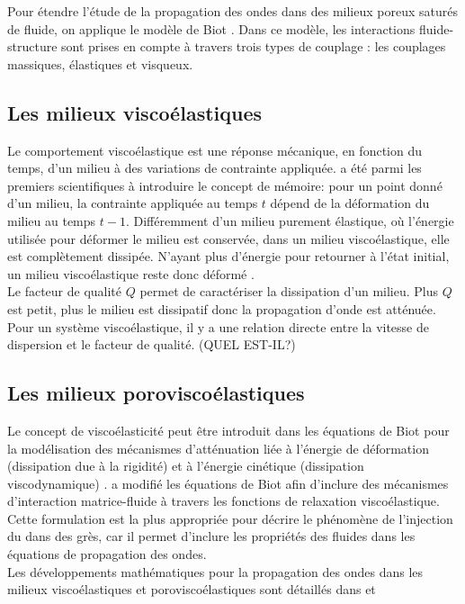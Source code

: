 Pour étendre l'étude de la propagation des ondes dans des milieux poreux saturés de fluide, on applique le modèle de Biot \citep{Biot1956a,Biot1956b}. Dans ce modèle, les interactions fluide-structure sont prises en compte à travers trois types de couplage : les couplages massiques, élastiques et visqueux.
\subsection{Les milieux viscoélastiques}
Le comportement viscoélastique est une réponse mécanique, en fonction du temps, d'un milieu à des variations de contrainte appliquée. \citet{Boltzmann1874} a été parmi les premiers scientifiques à introduire le concept de mémoire: pour un point donné d'un milieu, la contrainte appliquée au temps $t$ dépend de la déformation du milieu au temps $t-1$. Différemment d'un milieu purement élastique, où l'énergie utilisée pour déformer le milieu est conservée, dans un milieu viscoélastique, elle est complètement dissipée. N'ayant plus d'énergie pour retourner à l'état initial, un milieu viscoélastique reste donc déformé \citep{Carcione2007}. \\
Le facteur de qualité $Q$ permet de caractériser la dissipation d'un milieu. Plus $Q$ est petit, plus le milieu est dissipatif donc la propagation d'onde est atténuée. Pour un système viscoélastique, il y a une relation directe entre la vitesse de dispersion et le facteur de qualité. (QUEL EST-IL?)
\subsection{Les milieux poroviscoélastiques}
Le concept de viscoélasticité peut être introduit dans les équations de Biot \citep{Biot1956a,Biot1956b} pour la modélisation des mécanismes d'atténuation liée à l'énergie de déformation (dissipation due à la rigidité) et à l'énergie cinétique (dissipation viscodynamique) \citep{Carcione2007}. \citet{Carcione1998} a modifié les équations de Biot afin d'inclure des mécanismes d'interaction matrice-fluide à travers les fonctions de relaxation viscoélastique. Cette formulation est la plus appropriée pour décrire le phénomène de l'injection du  dans des grès, car il permet d’inclure les propriétés des fluides dans les équations de propagation des ondes.\\
Les développements mathématiques pour la propagation des ondes dans les milieux viscoélastiques et poroviscoélastiques sont détaillés dans \citet{Bourbie1986} et \citet{Carcione2007}
